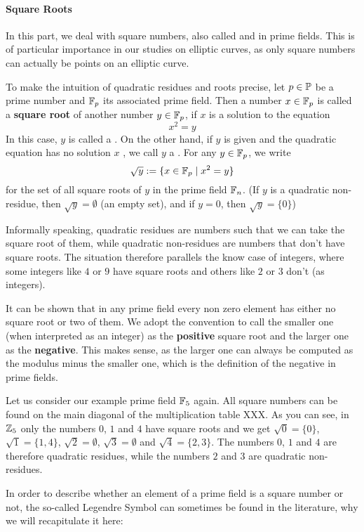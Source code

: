 \paragraph{Square Roots}
In this part, we deal with square numbers, also called  and  in prime fields. This is of particular importance in our studies on elliptic curves, as only square numbers can actually be points on an elliptic curve.

To make the intuition of quadratic residues and roots precise, let $p \in \mathbb{P} $ be a prime number and $\mathbb{F}_p $ its associated prime field. Then a number $x\in \mathbb{F}_p$ is called a \textbf{square root} of another number $y\in\mathbb{F}_p$, if $x$ is a solution to the equation
\begin{equation}
x^2 = y
\end{equation}
In this case, $y$ is called a . On the other hand, if $y$ is given and the quadratic equation has no solution $x$ , we call $ y $ a . For any $ y \in \mathbb{F}_p $, we write
\begin{equation}
\sqrt{y}: = \{x \in \mathbb{F}_p \; | \; x^2 = y \}
\end{equation}
for the set of all square roots of $ y $ in the prime field $ \mathbb{F}_n $. (If $ y $ is a quadratic non-residue, then $ \sqrt{y} = \emptyset $ (an empty set), and if $ y = 0 $, then $ \sqrt{y} = \{0 \} $)

Informally speaking, quadratic residues are numbers such that we can take the square root of them, while quadratic non-residues are numbers that don't have square roots. The situation therefore parallels the know case of integers, where some integers like $4$ or $9$ have square roots and others like $2$ or $3$ don't (as integers).

It can be shown that in any prime field every non zero element has either no square root or two of them. We adopt the convention to call the smaller one (when interpreted as an integer) as the \textbf{positive} square root and the larger one as the \textbf{negative}. This makes sense, as the larger one can always be computed as the modulus minus the smaller one, which is the definition of the negative in prime fields.


\begin{example}  Let us consider our example prime field $\mathbb{F}_5$ again. All square numbers can be found on the main diagonal of the multiplication table XXX. As you can see, in $ \mathbb{Z}_5 $ only the numbers $ 0 $, $ 1 $ and $ 4 $ have square roots and we get $ \sqrt{0} = \{0 \} $, $ \sqrt{1} = \{1,4 \} $, $ \sqrt{2} = \emptyset $, $ \sqrt{3} = \emptyset $ and $ \sqrt{4} = \{2,3 \} $. The numbers $0$, $1$ and $4$ are therefore quadratic residues, while the numbers $2$ and $3$ are quadratic non-residues.
\end{example}
In order to describe whether an element of a prime field is a square number  or not, the so-called Legendre Symbol can sometimes be found in the literature, why we will recapitulate it here:

